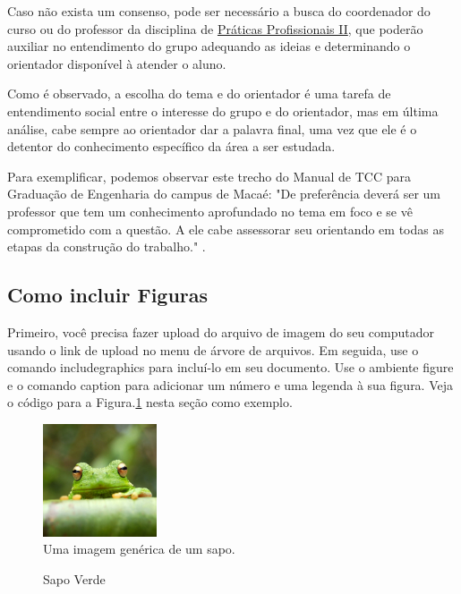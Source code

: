 \documentclass[a4paper,12pt]{article}
\begin{document}
Caso não exista um consenso, pode ser necessário a busca do coordenador do curso ou do professor da disciplina de \underline{Práticas Profissionais II}, que poderão auxiliar no entendimento do grupo adequando as ideias e determinando o orientador disponível à atender o aluno.

Como é observado, a escolha do tema e do orientador é uma tarefa de entendimento social entre o interesse do grupo e do orientador, mas em última análise, cabe sempre ao orientador dar a palavra final, uma vez que ele é o detentor do conhecimento específico da área a ser estudada.

Para exemplificar, podemos observar este trecho do Manual de TCC para Graduação de Engenharia do campus de Macaé: "De preferência deverá ser um professor que tem um conhecimento aprofundado no tema em foco e se vê comprometido com a questão. A ele cabe assessorar seu orientando em todas as etapas da construção do trabalho." \citep{botelho2021praticas}.


\subsection{Como incluir Figuras}

Primeiro, você precisa fazer upload do arquivo de imagem do seu computador usando o link de upload no menu de árvore de arquivos. Em seguida, use o comando includegraphics para incluí-lo em seu documento. Use o ambiente figure e o comando caption para adicionar um número e uma legenda à sua figura. Veja o código para a Figura.\ref{fig:frog} nesta seção como exemplo.

\begin{figure}[h]
\centering
\caption{Sapo Verde}
\includegraphics[width=0.3\textwidth]{frog.jpg}
\\\footnotesize{Uma imagem genérica de um sapo.}
\label{fig:frog}
\end{figure}
\end{document}
